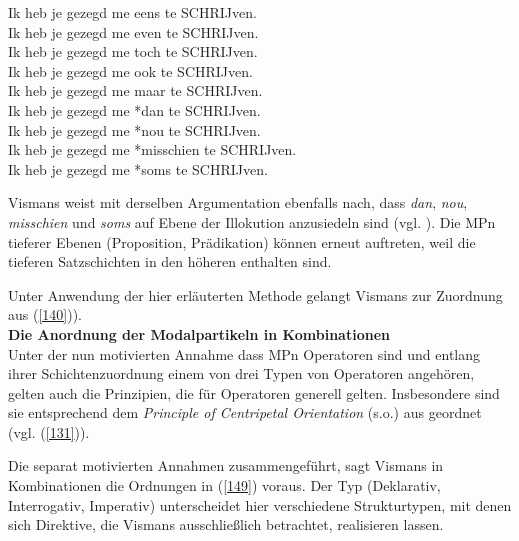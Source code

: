 \begin{exe}
	\ex\label{147} 
	Ik   heb   je  gezegd me eens te SCHRIJven.\\
	Ik   heb   je  gezegd me even te SCHRIJven.\\
	Ik   heb   je  gezegd me toch te SCHRIJven.\\
	Ik   heb   je  gezegd me ook te SCHRIJven.\\
	Ik   heb   je  gezegd me maar te SCHRIJven.\\
	Ik   heb   je  gezegd me *dan te SCHRIJven.\\
	Ik   heb   je  gezegd me *nou te SCHRIJven.\\
	Ik   heb   je  gezegd me *misschien te SCHRIJven.\\
	Ik   heb   je  gezegd me *soms te SCHRIJven.
	\hfill\hbox {\citet[158]{Vismans1994}}
\end{exe}
Vismans weist mit derselben Argumentation ebenfalls nach, dass \textit{dan}, \textit{nou}, \textit{misschien} und \textit{soms} auf Ebene der Illokution anzusiedeln sind (vgl. \citealt[159]{Vismans1994}). Die MPn tieferer Ebenen (Proposition, Prädikation) können erneut auftreten, weil die tieferen Satzschichten in den höheren enthalten sind. 

Unter Anwendung der hier erläuterten Methode gelangt Vismans zur Zuordnung aus (\ref{140})).\\
\newline
\noindent
\textbf{Die Anordnung der Modalpartikeln in Kombinationen}\\
Unter der nun motivierten Annahme dass MPn Operatoren sind und entlang ihrer Schichtenzuordnung einem von drei Typen von Operatoren angehören, gelten auch die Prinzipien, die für Operatoren generell gelten. Insbesondere sind sie entsprechend dem \textit{Principle of Centripetal Orientation}  (s.o.) aus \citet{Dik1997} geordnet (vgl. (\ref{131})).

Die separat motivierten Annahmen zusammengeführt, sagt Vismans in Kombinationen die Ordnungen in (\ref{149}) voraus. Der Typ (Deklarativ, Interrogativ, Imperativ) unterscheidet hier verschiedene Strukturtypen, mit denen sich Direktive, die Vismans ausschließlich betrachtet, realisieren lassen.
					    
